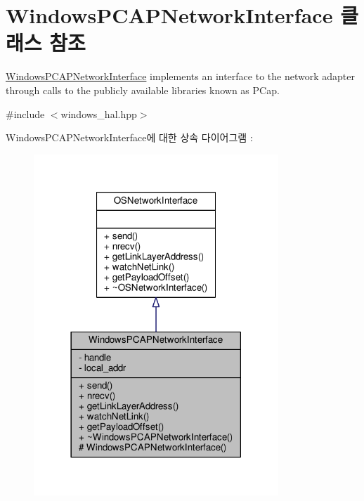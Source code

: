 \hypertarget{class_windows_p_c_a_p_network_interface}{}\section{Windows\+P\+C\+A\+P\+Network\+Interface 클래스 참조}
\label{class_windows_p_c_a_p_network_interface}


\hyperlink{class_windows_p_c_a_p_network_interface}{Windows\+P\+C\+A\+P\+Network\+Interface} implements an interface to the network adapter through calls to the publicly available libraries known as P\+Cap.  




{\ttfamily \#include $<$windows\+\_\+hal.\+hpp$>$}



Windows\+P\+C\+A\+P\+Network\+Interface에 대한 상속 다이어그램 \+: 
\nopagebreak
\begin{figure}[H]
\begin{center}
\leavevmode
\includegraphics[width=261pt]{class_windows_p_c_a_p_network_interface__inherit__graph}
\end{center}
\end{figure}


